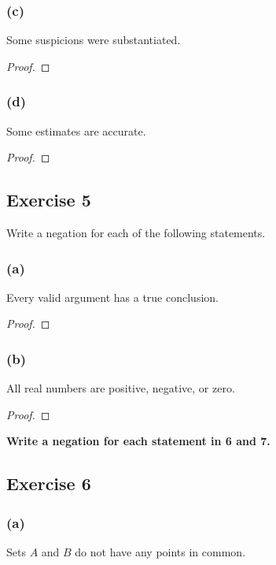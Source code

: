 \documentclass[14pt]{extarticle}
\begin{document}
\subsubsection{(c)}
Some suspicions were substantiated.

\begin{proof}

\end{proof}

\subsubsection{(d)}
Some estimates are accurate.

\begin{proof}

\end{proof}

\subsection{Exercise 5}
Write a negation for each of the following statements.

\subsubsection{(a)}
Every valid argument has a true conclusion.

\begin{proof}

\end{proof}

\subsubsection{(b)}
All real numbers are positive, negative, or zero.

\begin{proof}

\end{proof}

{\bf \color{cyan}Write a negation for each statement in 6 and 7.}

\subsection{Exercise 6}

\subsubsection{(a)}
Sets $A$ and $B$ do not have any points in common.
\end{document}
